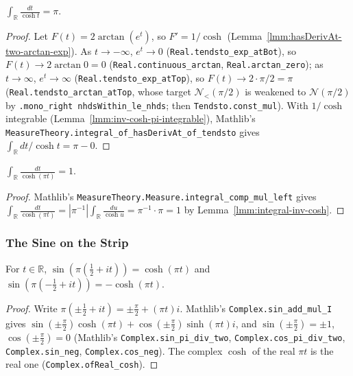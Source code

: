 \begin{lemma}[$\int_{\mathbb{R}} dt/\cosh t = \pi$]
    \label{lmm:integral-inv-cosh}
    \leanok
    $\int_{\mathbb{R}} \frac{dt}{\cosh t} = \pi$.
\end{lemma}
\begin{proof}
    \leanok
    Let $F(t) = 2\arctan(e^t)$, so $F' = 1/\cosh$ (Lemma~\ref{lmm:hasDerivAt-two-arctan-exp}). As $t \to -\infty$, $e^t \to 0$ (\texttt{Real.tendsto\_exp\_atBot}), so $F(t) \to 2\arctan 0 = 0$ (\texttt{Real.continuous\_arctan}, \texttt{Real.arctan\_zero}); as $t \to \infty$, $e^t \to \infty$ (\texttt{Real.tendsto\_exp\_atTop}), so $F(t) \to 2 \cdot \pi/2 = \pi$ (\texttt{Real.tendsto\_arctan\_atTop}, whose target $\mathcal{N}_{<}(\pi/2)$ is weakened to $\mathcal{N}(\pi/2)$ by \texttt{.mono\_right nhdsWithin\_le\_nhds}; then \texttt{Tendsto.const\_mul}). With $1/\cosh$ integrable (Lemma~\ref{lmm:inv-cosh-pi-integrable}), Mathlib's \texttt{MeasureTheory.integral\_of\_hasDerivAt\_of\_tendsto} gives $\int_{\mathbb{R}} dt/\cosh t = \pi - 0$.
\end{proof}

\begin{lemma}[$\int_{\mathbb{R}} dt/\cosh(\pi t) = 1$]
    \label{lmm:integral-inv-cosh-pi}
    \leanok
    $\int_{\mathbb{R}} \frac{dt}{\cosh(\pi t)} = 1$.
\end{lemma}
\begin{proof}
    \leanok
    Mathlib's \texttt{MeasureTheory.Measure.integral\_comp\_mul\_left} gives $\int_{\mathbb{R}} \frac{dt}{\cosh(\pi t)} = |\pi^{-1}| \int_{\mathbb{R}} \frac{du}{\cosh u} = \pi^{-1} \cdot \pi = 1$ by Lemma~\ref{lmm:integral-inv-cosh}.
\end{proof}

\subsubsection{The Sine on the Strip}

\begin{lemma}
    \label{lmm:sin-strip-boundary}
    \leanok
    For $t \in \mathbb{R}$, $\sin(\pi(\tfrac{1}{2} + it)) = \cosh(\pi t)$ and $\sin(\pi(-\tfrac{1}{2} + it)) = -\cosh(\pi t)$.
\end{lemma}
\begin{proof}
    \leanok
    Write $\pi(\pm\tfrac{1}{2} + it) = \pm\tfrac{\pi}{2} + (\pi t)i$. Mathlib's \texttt{Complex.sin\_add\_mul\_I} gives $\sin(\pm\tfrac{\pi}{2})\cosh(\pi t) + \cos(\pm\tfrac{\pi}{2})\sinh(\pi t) i$, and $\sin(\pm\tfrac{\pi}{2}) = \pm 1$, $\cos(\pm\tfrac{\pi}{2}) = 0$ (Mathlib's \texttt{Complex.sin\_pi\_div\_two}, \texttt{Complex.cos\_pi\_div\_two}, \texttt{Complex.sin\_neg}, \texttt{Complex.cos\_neg}). The complex $\cosh$ of the real $\pi t$ is the real one (\texttt{Complex.ofReal\_cosh}).
\end{proof}

